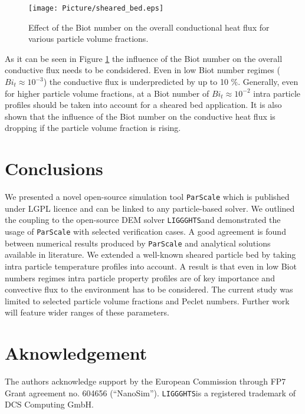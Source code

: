 \documentclass{particles2015}
\begin{document}
\begin{figure}[h!]
   \centering
   \texttt{[image: Picture/sheared\_bed.eps]}
   \caption{Effect of the Biot number on the overall conductional heat flux for various particle volume fractions.}
   \label{fig:sheared_bed}
\end{figure}

As it can be seen in Figure \ref{fig:sheared_bed} the influence of the Biot number on the overall conductive flux needs to be condsidered. Even in low Biot number regimes ($Bi_t \approx 10^{-3}$) the conductive flux is underpredicted by up to 10 $\%$. Generally, even for higher particle volume fractions, at a Biot number of $Bi_t \approx 10^{-2}$ intra particle profiles should be taken into account for a sheared bed application. It is also shown that the influence of the Biot number on the conductive heat flux is dropping if the particle volume fraction is rising. 


\section{Conclusions}
\label{sec:conclusions}

We presented a novel open-source simulation tool \texttt{ParScale} which is published under LGPL licence and can be linked to any particle-based solver. We outlined the coupling to the open-source DEM solver \texttt{LIGGGHTS}\textregistered and demonstrated the usage of \texttt{ParScale} with selected verification cases. A good agreement is found between numerical results produced by \texttt{ParScale} and analytical solutions available in literature. We extended a well-known sheared particle bed by taking intra particle temperature profiles into account. A result is that even in low Biot numbers regimes intra particle property profiles are of key importance and convective flux to the environment has to be considered. The current study was limited to selected particle volume fractions and Peclet numbers. Further work will feature wider ranges of these parameters. 

\section{Aknowledgement}
The authors acknowledge support by the European Commission through FP7 Grant agreement no. 604656 (“NanoSim”). \texttt{LIGGGHTS}\textregistered is a registered trademark of DCS Computing GmbH.

\newpage

\end{document}
